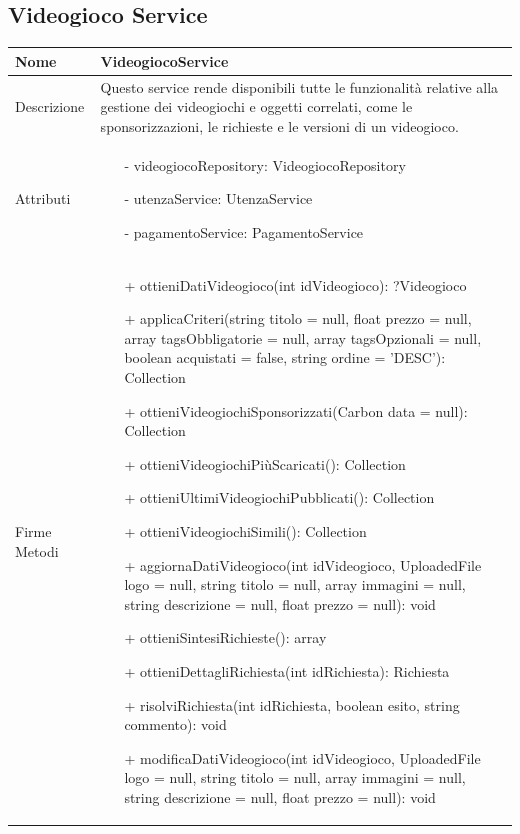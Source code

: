 \newpage
\subsection{Videogioco Service}
\small\begin{tabular}{|| l | p{28em} ||} 
	\hline
	Nome & VideogiocoService\\
	\hline
	Descrizione & Questo service rende disponibili tutte le funzionalità relative alla gestione dei videogiochi e oggetti correlati, come le sponsorizzazioni, le richieste e le versioni di un videogioco. \\
	\hline
	Attributi & \begin{itemize}
		\item[-] videogiocoRepository: VideogiocoRepository
		\item[-] utenzaService: UtenzaService
		\item[-] pagamentoService: PagamentoService 
	\end{itemize}\\
	\hline
	Firme Metodi & \begin{itemize}
		\item[+] ottieniDatiVideogioco(int idVideogioco): ?Videogioco
		\item[+] applicaCriteri(string titolo = null, float prezzo = null, array tagsObbligatorie = null, array tagsOpzionali = null, boolean acquistati = false, string ordine = 'DESC'): Collection
		\item[+] ottieniVideogiochiSponsorizzati(Carbon data = null): Collection
		\item[+] ottieniVideogiochiPiùScaricati(): Collection
		\item[+] ottieniUltimiVideogiochiPubblicati(): Collection
		\item[+] ottieniVideogiochiSimili(): Collection
		\item[+] aggiornaDatiVideogioco(int idVideogioco, UploadedFile logo = null, string titolo = null, array immagini = null, string descrizione = null, float prezzo = null): void
		\item[+] ottieniSintesiRichieste(): array
		\item[+] ottieniDettagliRichiesta(int idRichiesta): Richiesta
		\item[+] risolviRichiesta(int idRichiesta, boolean esito, string commento): void
		\item[+] modificaDatiVideogioco(int idVideogioco, UploadedFile logo = null, string titolo = null, array immagini = null, string descrizione = null, float prezzo = null): void

\end{itemize}
\end{tabular}
